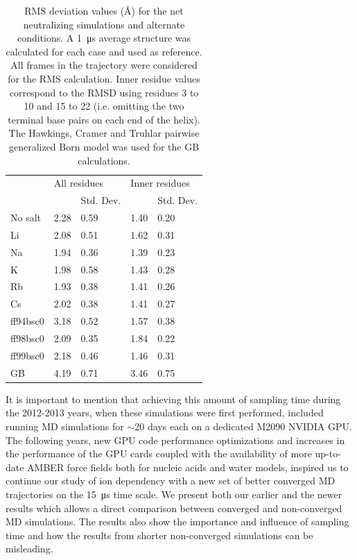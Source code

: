 \documentclass[9pt,lessons]{livecoms}
\begin{document}
\begin{table}[]
\caption{RMS deviation values (Å) for the net neutralizing simulations and alternate conditions. A \SI{1}{\micro\second} average structure was calculated for each case and used as reference. All
  frames in the trajectory were considered for the RMS calculation.  Inner residue values correspond to the RMSD using residues 3 to 10 and 15 to 22 (i.e. omitting the two terminal base pairs on each end of the helix). The Hawkings, Cramer and Truhlar pairwise generalized Born model was used for the GB calculations\cite{gb1996}.}
\label{1us-rmsd-net}
\begin{tabular}{lllll}
 & \multicolumn{2}{l}{All residues} & \multicolumn{2}{l}{Inner residues} \\
             &               & Std. Dev.          &        & Std. Dev.   \\
No salt      & 2.28          & 0.59               & 1.40   & 0.20        \\
Li           & 2.08          & 0.51               & 1.62   & 0.31        \\
Na           & 1.94          & 0.36               & 1.39   & 0.23        \\
K            & 1.98          & 0.58               & 1.43   & 0.28        \\
Rb           & 1.93          & 0.38               & 1.41   & 0.26        \\
Cs           & 2.02          & 0.38               & 1.41   & 0.27        \\
ff94bsc0     & 3.18          & 0.52               & 1.57   & 0.38        \\
ff98bsc0     & 2.09          & 0.35               & 1.84   & 0.22        \\
ff99bsc0     & 2.18          & 0.46               & 1.46   & 0.31        \\
GB           & 4.19          & 0.71               & 3.46   & 0.75       
\end{tabular}
\end{table}

It is important to mention that achieving this amount of sampling time
during the 2012-2013 years, when these simulations were first performed,
included running MD simulations for $\sim$20 days each on a dedicated M2090
NVIDIA GPU. The following years, new GPU code performance
optimizations\cite{Goetz2012,Salomon-Ferrer2013} and increases in the
performance of the GPU cards coupled with the availability of more
up-to-date AMBER force fields both for nucleic acids and water models,
inspired us to continue our study of ion dependency with a new set of
better converged MD trajectories on the \SI{15}{\micro\second} time
scale. We present both our earlier and the newer results which allows
a direct comparison between converged and non-converged MD
simulations. The results also show the importance and influence of sampling
time and how the results from shorter non-converged simulations can be
misleading.
\end{document}
